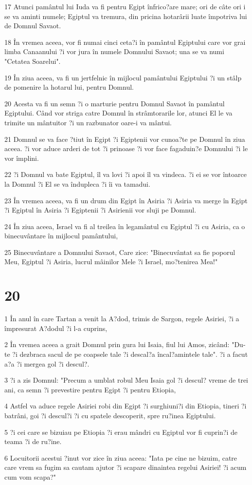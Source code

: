 \par 17 Atunci pamântul lui Iuda va fi pentru Egipt înfrico?are mare; ori de câte ori i se va aminti numele; Egiptul va tremura, din pricina hotarârii luate împotriva lui de Domnul Savaot.
\par 18 În vremea aceea, vor fi numai cinci ceta?i în pamântul Egiptului care vor grai limba Canaanului ?i vor jura în numele Domnului Savaot; una se va numi "Cetatea Soarelui".
\par 19 În ziua aceea, va fi un jertfelnic în mijlocul pamântului Egiptului ?i un stâlp de pomenire la hotarul lui, pentru Domnul.
\par 20 Acesta va fi un semn ?i o marturie pentru Domnul Savaot în pamântul Egiptului. Când vor striga catre Domnul în strâmtorarile lor, atunci El le va trimite un mântuitor ?i un razbunator oare-i va mântui.
\par 21 Domnul se va face ?tiut în Egipt ?i Egiptenii vor cunoa?te pe Domnul în ziua aceea. ?i vor aduce arderi de tot ?i prinoase ?i vor face fagaduin?e Domnului ?i le vor împlini.
\par 22 ?i Domnul va bate Egiptul, îl va lovi ?i apoi îl va vindeca. ?i ei se vor întoarce la Domnul ?i El se va îndupleca ?i îi va tamadui.
\par 23 În vremea aceea, va fi un drum din Egipt în Asiria ?i Asiria va merge în Egipt ?i Egiptul în Asiria ?i Egiptenii ?i Asirienii vor sluji pe Domnul.
\par 24 În ziua aceea, Israel va fi al treilea în legamântul cu Egiptul ?i cu Asiria, ca o binecuvântare în mijlocul pamântului,
\par 25 Binecuvântare a Domnului Savaot, Care zice: "Binecuvântat sa fie poporul Meu, Egiptul ?i Asiria, lucrul mâinilor Mele ?i Israel, mo?tenirea Mea!"

\chapter{20}

\par 1 În anul în care Tartan a venit la A?dod, trimis de Sargon, regele Asiriei, ?i a împresurat A?dodul ?i l-a cuprins,
\par 2 În vremea aceea a grait Domnul prin gura lui Isaia, fiul lui Amos, zicând: "Du-te ?i dezbraca sacul de pe coapsele tale ?i descal?a încal?amintele tale". ?i a facut a?a ?i mergea gol ?i descul?.
\par 3 ?i a zis Domnul: "Precum a umblat robul Meu Isaia gol ?i descul? vreme de trei ani, ca semn ?i prevestire pentru Egipt ?i pentru Etiopia,
\par 4 Astfel va aduce regele Asiriei robi din Egipt ?i surghiuni?i din Etiopia, tineri ?i batrâni, goi ?i descul?i ?i cu spatele descoperit, spre ru?inea Egiptului.
\par 5 ?i cei care se bizuiau pe Etiopia ?i erau mândri cu Egiptul vor fi cuprin?i de teama ?i de ru?ine.
\par 6 Locuitorii acestui ?inut vor zice în ziua aceea: "Iata pe cine ne bizuim, catre care vrem sa fugim sa cautam ajutor ?i scapare dinaintea regelui Asiriei! ?i acum cum vom scapa?"

